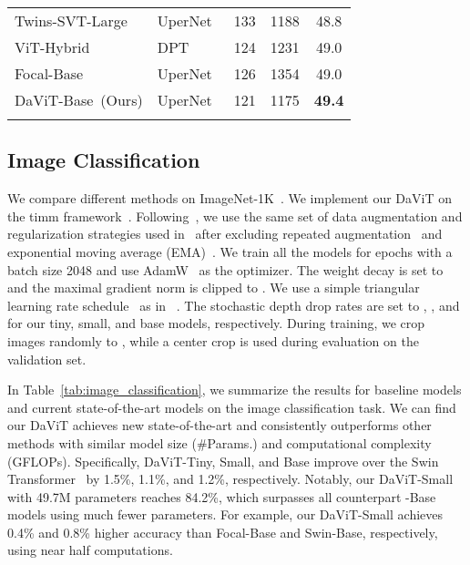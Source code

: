 \documentclass[runningheads]{llncs}
\newcommand{\model}{DaViT\xspace}
\newcommand{\modelInTable}{DaViT\xspace}
\newlength\savewidth
\newcommand\shline{\noalign{\global\savewidth\arrayrulewidth
  \global\arrayrulewidth 1pt}\hline\noalign{\global\arrayrulewidth\savewidth}}
\begin{document}
\begin{table}
{\begin{tabular}{ll|ccc}
    Twins-SVT-Large~\cite{chu2021twins} & UperNet~\cite{xiao2018unified} & 133 & 1188 & 48.8 \\
    ViT-Hybrid~\cite{ranftl2021vision} & DPT~\cite{ranftl2021vision} & 124 & 1231 & 49.0 \\
    Focal-Base~\cite{yang2021focal} & UperNet~\cite{xiao2018unified} & 126 & 1354 & 49.0 \\\rowcolor{Gray} 
    \modelInTable-Base~(Ours) & UperNet~\cite{xiao2018unified} & 121 & 1175 & \textbf{49.4} \\\shline
  \end{tabular} 
  }
  \label{tab:semantic_segmentation}
\end{table}
 
\subsection{Image Classification}

We compare different methods on ImageNet-1K~\cite{deng2009imagenet}. We implement our \model on the timm framework~\cite{wightman2019pytorch}.
Following~\cite{liu2021swin,lin2017focal,wu2021cvt,zhang2021multi}, we use the same set of data augmentation and regularization strategies used in~\cite{touvron2021training} after excluding repeated augmentation~\cite{berman2019multigrain,hoffer2020augment} and exponential moving average (EMA)~\cite{polyak1992acceleration}. 
We train all the models for  epochs with a batch size 2048 and use AdamW~\cite{loshchilov2017decoupled} as the optimizer.
The weight decay is set to  and the maximal gradient norm is clipped to .
We use a simple triangular learning rate schedule~\cite{smith2019super} as in ~\cite{anonymous2022patches}.
The stochastic depth drop rates are set to , , and  for our tiny, small, and base models, respectively. During training, we crop images randomly to , while a center crop is used during evaluation on the validation set.



In Table~\ref{tab:image_classification}, we summarize the results for baseline models and current state-of-the-art models on the image classification task. We can find our \model achieves new state-of-the-art and consistently outperforms other methods with similar model size (\#Params.) and computational complexity (GFLOPs). 
Specifically, \modelInTable-Tiny, Small, and Base improve over the Swin Transformer~\cite{liu2021swin} by 1.5\%, 1.1\%, and 1.2\%, respectively.
Notably, our \modelInTable-Small with 49.7M parameters reaches 84.2\%, which surpasses all counterpart -Base models using much fewer parameters. For example, our \modelInTable-Small achieves 0.4\% and 0.8\% higher accuracy than Focal-Base and Swin-Base, respectively, using near half computations. 
\end{document}
